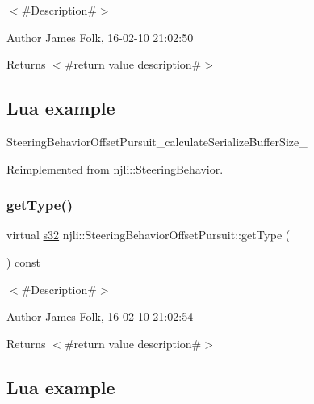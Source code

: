$<$\#\+Description\#$>$ 

\begin{DoxyAuthor}{Author}
James Folk, 16-\/02-\/10 21\+:02\+:50
\end{DoxyAuthor}
\begin{DoxyReturn}{Returns}
$<$\#return value description\#$>$
\end{DoxyReturn}
\hypertarget{classnjli_1_1_steering_behavior_wander_ex1}{}\subsection{Lua example}\label{classnjli_1_1_steering_behavior_wander_ex1}

\begin{DoxyCodeInclude}
\end{DoxyCodeInclude}
Steering\+Behavior\+Offset\+Pursuit\+\_\+calculate\+Serialize\+Buffer\+Size\+\_\+ 

Reimplemented from \mbox{\hyperlink{classnjli_1_1_steering_behavior_abb58d6982dc295fc3e90f096f51b0ef8}{njli\+::\+Steering\+Behavior}}.

\mbox{\label{classnjli_1_1_steering_behavior_offset_pursuit_acafec56dc840745c2fa9039c9a7c8507}} 
\subsubsection{\texorpdfstring{get\+Type()}{getType()}}
{\footnotesize\ttfamily virtual \mbox{\hyperlink{_util_8h_aa62c75d314a0d1f37f79c4b73b2292e2}{s32}} njli\+::\+Steering\+Behavior\+Offset\+Pursuit\+::get\+Type (\begin{DoxyParamCaption}{ }\end{DoxyParamCaption}) const\hspace{0.3cm}{\ttfamily [virtual]}}



$<$\#\+Description\#$>$ 

\begin{DoxyAuthor}{Author}
James Folk, 16-\/02-\/10 21\+:02\+:54
\end{DoxyAuthor}
\begin{DoxyReturn}{Returns}
$<$\#return value description\#$>$
\end{DoxyReturn}
\hypertarget{classnjli_1_1_steering_behavior_wander_ex1}{}\subsection{Lua example}\label{classnjli_1_1_steering_behavior_wander_ex1}


